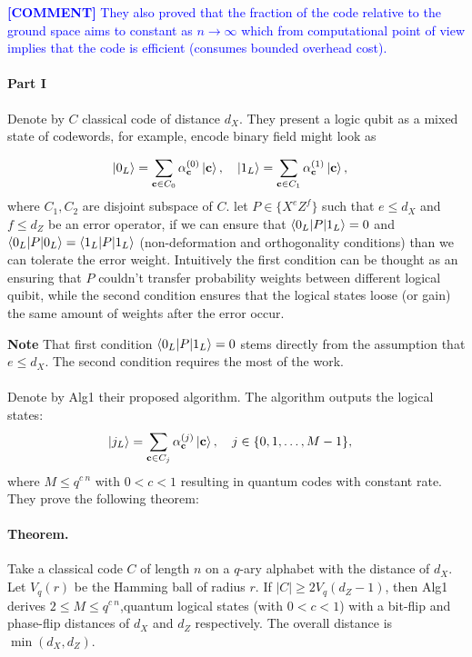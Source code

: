 \documentclass{article}
\newcommand{\commentt}[1]{\textcolor{blue}{ \textbf{[COMMENT]} #1}}
\begin{document}
\commentt{They also proved that the fraction of the code relative to the ground space aims to constant as \(n \rightarrow \infty \) which from computational point of view implies that the code is efficient (consumes bounded overhead cost).} 

\paragraph{Part I}

Denote by \( C \) classical code of distance \(d_X\). They present a logic qubit as a mixed state of codewords, for example, encode binary field might look as      

\begin{align}
    \ket{0_L} &= \sum_{{\bf c} \in C_0}  \alpha^{(0)}_{\bf c}\ket{{\bf c}} , \quad 
    \ket{1_L} = \sum_{{\bf c} \in C_1}  \alpha^{(1)}_{\bf c}\ket{{\bf c}} , \label{form1}
\end{align}
where \(C_1 , C_2\) are disjoint subspace of \(C\). let \( P \in \{ X^eZ^f \} \) such that \( e \le d_X \) and \( f \le d_Z \) be an error operator, if we can ensure that \( \braket{0_L|P|1_L} = 0 \) and \( \braket{0_L|P|0_L} = \braket{1_L|P|1_L} \) (non-deformation and orthogonality conditions) than we can tolerate the error weight. Intuitively the first condition can be thought as an ensuring that \( P \) couldn't transfer probability weights between different logical quibit, while the second condition ensures that the logical states loose (or gain) the same amount of weights after the error occur. 

\textbf{Note} That first condition \( \braket{0_L|P|1_L} = 0 \) stems directly from the assumption that \( e \le d_X \). The second condition requires the most of the work.   

\paragraph{}
 
Denote by Alg1 their proposed algorithm. The algorithm outputs the logical states:
\begin{align}
    \ket{j_L} &= \sum_{{\bf c} \in C_j}  \alpha^{(j)}_{\bf c}\ket{\bf c} , \quad 
    j\in\{0,1,\dots,M-1\} , \label{formM}
\end{align}
where \(M\le q^{c\:n}\) with \(0<c<1\) resulting in quantum codes with constant rate. They prove the following theorem:

\paragraph{Theorem.}
Take a classical code \(C\) of length \(n\) on a \(q\)-ary alphabet with 
the distance of $d_X$. Let $V_{q}(r)$ be the Hamming ball of radius \(r\). If  \(|C|\ge 2V_{q}(d_Z-1)\), then Alg1 derives  \(2 \le M\le q^{c\:n}\),quantum logical states (with \(0<c<1\))  with a bit-flip and phase-flip  distances of \(d_X\) and \(d_Z\) respectively. The overall  distance is \(\min(d_X,d_Z)\).
\end{document}
